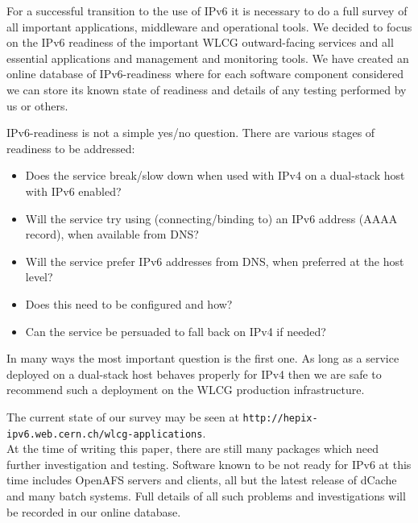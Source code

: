 For a successful transition to the use of IPv6 it is necessary to do a full survey of all important applications, middleware and operational tools. We decided to focus on the IPv6 readiness of the important WLCG outward-facing services and all essential applications and management and monitoring tools. We have created an online database of IPv6-readiness where for each software component considered we can store its known state of readiness and details of any testing performed by us or others.

IPv6-readiness is not a simple yes/no question. There are various stages of readiness to be addressed:
\begin {itemize}
\item Does the service break/slow down when used with IPv4 on a dual-stack host with IPv6 enabled?
\item Will the service try using (connecting/binding to) an IPv6 address (AAAA record), when available from DNS?
\item Will the service prefer IPv6 addresses from DNS, when preferred at the host level?
\item Does this need to be configured and how?
\item Can the service be persuaded to fall back on IPv4 if needed?
\end {itemize}

In many ways the most important question is the first one. As long as a service deployed on a dual-stack host behaves properly for IPv4 then we are safe to recommend such a deployment on the WLCG production infrastructure.

The current state of our survey may be seen at {\tt http://hepix-ipv6.web.cern.ch/wlcg-applications}. \\ 
At the time of 
writing this paper, there are still many packages which need further investigation and testing. Software known to be 
not ready for IPv6 at this time includes OpenAFS servers and clients, all but the latest release of dCache and many batch systems. Full details of all such problems and investigations will be recorded in our online database.


